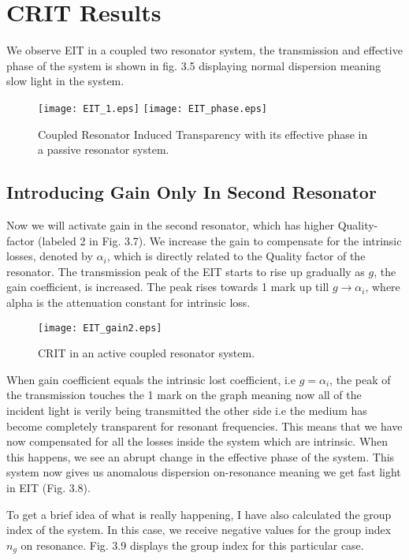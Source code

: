 \section{CRIT Results}
We observe EIT in a coupled two resonator system, the transmission and effective phase of the system is shown in fig. 3.5 displaying normal dispersion meaning slow light in the system.

\begin{figure}[h]
\texttt{[image: EIT\_1.eps]}
\texttt{[image: EIT\_phase.eps]}
\caption{Coupled Resonator Induced Transparency with its effective phase in a passive resonator system.}
\end{figure}

\subsection{Introducing Gain Only In Second Resonator}
Now we will activate gain in the second resonator, which has higher Quality-factor (labeled 2 in Fig. 3.7). We increase the gain to compensate for the intrinsic losses, denoted by $\alpha_{i}$, which is directly related to the Quality factor of the resonator. The transmission peak of the EIT starts to rise up gradually as $g$, the gain coefficient, is increased. The peak rises towards 1 mark up till $g \to \alpha_{i}$, where alpha is the attenuation constant for intrinsic loss. 

\begin{figure}[h]
\centering
\texttt{[image: EIT\_gain2.eps]}
\caption{CRIT in an active coupled resonator system.}
\end{figure}

When gain coefficient equals the intrinsic lost coefficient, i.e $g = \alpha_{i}$, the peak of the transmission touches the 1 mark on the graph meaning now all of the incident light is verily being transmitted the other side i.e the medium has become completely transparent for resonant frequencies. This means that we have now compensated for all the losses inside the system which are intrinsic. When this happens, we see an abrupt change in the effective phase of the system. This system now gives us anomalous dispersion on-resonance meaning we get fast light in EIT (Fig. 3.8). 

To get a brief idea of what is really happening, I have also calculated the group index of the system. In this case, we receive negative values for the group index $n_{g}$ on resonance. Fig. 3.9 displays the group index for this particular case.


